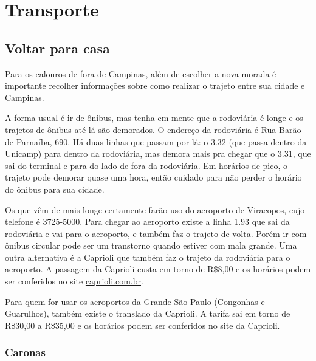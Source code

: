
\section{Transporte}
\subsection{Voltar para casa}

Para os calouros de fora de Campinas, além de escolher a nova morada é
importante recolher informações sobre como realizar o trajeto entre sua cidade e
Campinas.

A forma usual é ir de ônibus, mas tenha em mente que a rodoviária é longe e os
trajetos de ônibus até lá são demorados. O endereço da rodoviária é Rua Barão de
Parnaíba, 690. Há duas linhas que passam por lá: o 3.32 (que passa dentro da
Unicamp) para dentro da rodoviária, mas demora mais pra chegar que o 3.31, que
sai do terminal e para do lado de fora da rodoviária. Em horários de pico, o
trajeto pode demorar quase uma hora, então cuidado para não perder o horário do
ônibus para sua cidade.

Os que vêm de mais longe certamente farão uso do aeroporto de Viracopos, cujo
telefone é 3725-5000. Para chegar ao aeroporto existe a linha 1.93 que sai da
rodoviária e vai para o aeroporto, e também faz o trajeto de volta. Porém ir com
ônibus circular pode ser um transtorno quando estiver com mala grande. Uma outra
alternativa é a Caprioli que também faz o trajeto da rodoviária para o
aeroporto. A passagem da Caprioli custa em torno de R\$8,00 e os horários podem
ser conferidos no site \url{caprioli.com.br}.

Para quem for usar os aeroportos da Grande São Paulo (Congonhas e Guarulhos),
também existe o translado da Caprioli. A tarifa sai em torno de R\$30,00 a
R\$35,00 e os horários podem ser conferidos no site da Caprioli.

\subsubsection*{Caronas}

